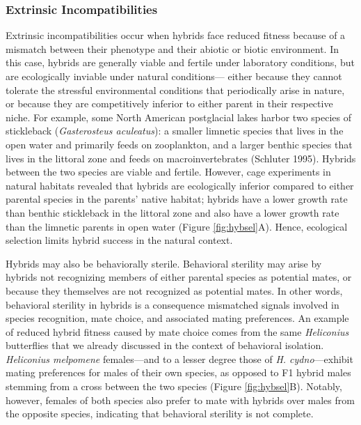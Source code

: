 \documentclass[
]{book}
\begin{document}
\hypertarget{extrinsic-incompatibilities}{%
\subsubsection*{Extrinsic Incompatibilities}\label{extrinsic-incompatibilities}}

Extrinsic incompatibilities occur when hybrids face reduced fitness because of a mismatch between their phenotype and their abiotic or biotic environment. In this case, hybrids are generally viable and fertile under laboratory conditions, but are ecologically inviable under natural conditions--- either because they cannot tolerate the stressful environmental conditions that periodically arise in nature, or because they are competitively inferior to either parent in their respective niche. For example, some North American postglacial lakes harbor two species of stickleback (\emph{Gasterosteus aculeatus}): a smaller limnetic species that lives in the open water and primarily feeds on zooplankton, and a larger benthic species that lives in the littoral zone and feeds on macroinvertebrates (Schluter 1995). Hybrids between the two species are viable and fertile. However, cage experiments in natural habitats revealed that hybrids are ecologically inferior compared to either parental species in the parents' native habitat; hybrids have a lower growth rate than benthic stickleback in the littoral zone and also have a lower growth rate than the limnetic parents in open water (Figure \ref{fig:hybsel}A). Hence, ecological selection limits hybrid success in the natural context.

Hybrids may also be behaviorally sterile. Behavioral sterility may arise by hybrids not recognizing members of either parental species as potential mates, or because they themselves are not recognized as potential mates. In other words, behavioral sterility in hybrids is a consequence mismatched signals involved in species recognition, mate choice, and associated mating preferences. An example of reduced hybrid fitness caused by mate choice comes from the same \emph{Heliconius} butterflies that we already discussed in the context of behavioral isolation. \emph{Heliconius melpomene} females---and to a lesser degree those of \emph{H. cydno}---exhibit mating preferences for males of their own species, as opposed to F1 hybrid males stemming from a cross between the two species (Figure \ref{fig:hybsel}B). Notably, however, females of both species also prefer to mate with hybrids over males from the opposite species, indicating that behavioral sterility is not complete.
\end{document}
